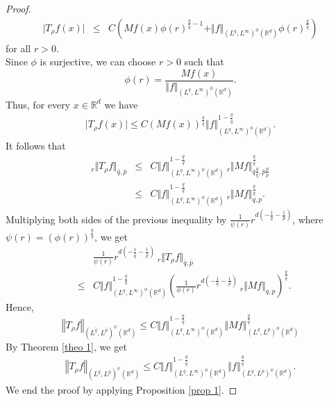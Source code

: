 \documentclass[10pt,a4paper]{amsart}
\numberwithin{equation}{section}
\numberwithin{equation}{section}
\begin{document}
\begin{proof}
\begin{eqnarray*}
\vert T_{\rho} f(x) \vert &\leq& C\left(M f(x) \phi(r)^{\frac{q}{\bar{q}}-1}+\Vert f \Vert_{(L^{q},L^{\infty})^{\phi}(\mathbb{R}^{d})}\phi(r)^{\frac{q}{\bar{q}}}\right)
\end{eqnarray*}
for all $ r > 0 $. \\ 
Since $ \phi $ is surjective, we can choose  $ r > 0 $ such that $$ \phi(r)= \frac{M f(x)}{\Vert f \Vert_{(L^{q},L^{\infty})^{\phi}(\mathbb{R}^{d})}}. $$
Thus, for every $ x \in \mathbb{R}^{d} $ we have  
\begin{eqnarray*} \label{rel 55}
\vert T_{\rho} f(x) \vert \leq C (M f(x))^{\frac{q}{\bar{q}}}\Vert f \Vert^{1-\frac{q}{\bar{q}}}_{(L^{q},L^{\infty})^{\phi}(\mathbb{R}^{d})}.
\end{eqnarray*}
It follows that 
\begin{eqnarray*}
_{r}\Vert T_{\rho} f \Vert_{\bar{q},\bar{p}} &\leq& C\Vert f \Vert^{1-\frac{q}{\bar{q}}}_{(L^{q},L^{\infty})^{\phi}(\mathbb{R}^{d})}\:_{r}\Vert M f \Vert^{\frac{q}{\bar{q}}}_{\bar{q}\frac{q}{\bar{q}},\bar{p}\frac{p}{\bar{p}}}\\
&\leq& C\Vert f \Vert^{1-\frac{q}{\bar{q}}}_{(L^{q},L^{\infty})^{\phi}(\mathbb{R}^{d})}\:_{r}\Vert M f \Vert^{\frac{q}{\bar{q}}}_{q,p}.
\end{eqnarray*}
Multiplying both sides of the previous inequality by $ \frac{1}{\psi(r)} r^{d(-\frac{1}{\bar{q}}-\frac{1}{\bar{p}})} $, where  $\psi(r)= (\phi(r))^{\frac{q}{\bar{q}}}$, we get 
\begin{eqnarray*}
&&\frac{1}{\psi(r)} r^{d(-\frac{1}{\bar{q}}-\frac{1}{\bar{p}})} \:_{r}\Vert T_{\rho} f \Vert_{\bar{q},\bar{p}} \\  &\leq& C\Vert f \Vert^{1-\frac{q}{\bar{q}}}_{(L^{q},L^{\infty})^{\phi}(\mathbb{R}^{d})}   \left(  \frac{1}{\phi(r)} r^{d(-\frac{1}{q}-\frac{1}{p})}\:_{r}\Vert M f \Vert_{q,p}  \right)^{\frac{q}{\bar{q}}}.
\end{eqnarray*}
Hence,  $$\left\Vert T_{\rho}f \right\Vert_{(L^{\bar{q}},L^{\bar{p}})^{\psi}(\mathbb{R}^{d})} \leq C\Vert f \Vert^{1-\frac{q}{\bar{q}}}_{(L^{q},L^{\infty})^{\phi}(\mathbb{R}^{d})} \left\Vert Mf  \right\Vert^{\frac{q}{\bar{q}}}_{(L^{q},L^{p})^{\phi}(\mathbb{R}^{d})}$$
By Theorem \ref{theo 1}, we get 
\begin{eqnarray*}\label{rel 18}
\left\Vert T_{\rho}f \right\Vert_{(L^{\bar{q}},L^{\bar{p}})^{\psi}(\mathbb{R}^{d})} \leq C\Vert f \Vert^{1-\frac{q}{\bar{q}}}_{(L^{q},L^{\infty})^{\phi}(\mathbb{R}^{d})}  \left\Vert f  \right\Vert^{\frac{q}{\bar{q}}}_{(L^{q},L^{p})^{\phi}(\mathbb{R}^{d})}.
\end{eqnarray*}
We end the proof by applying Proposition \ref{prop 1}.
\end{proof}
\end{document}
